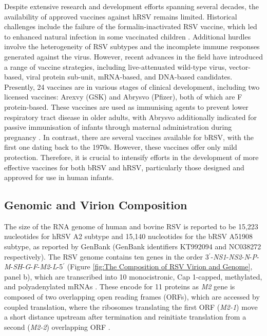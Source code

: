 Despite extensive research and development efforts spanning several decades, the availability of approved vaccines against hRSV remains limited. Historical challenges include the failure of the formalin-inactivated RSV vaccine, which led to enhanced natural infection in some vaccinated children \cite{Fulginiti1969RespiratoryVaccine., Kim1969RespiratoryVaccine.}. Additional hurdles involve the heterogeneity of RSV subtypes and the incomplete immune responses generated against the virus. However, recent advances in the field have introduced a range of vaccine strategies, including live-attenuated wild-type virus, vector-based, viral protein sub-unit, mRNA-based, and DNA-based candidates. Presently, 24 vaccines are in various stages of clinical development, including two licensed vaccines: Arexvy (GSK) and Abrysvo (Pfizer), both of which are F protein-based. These vaccines are used as immunising agents to prevent lower respiratory tract disease in older adults, with Abrysvo additionally indicated for passive immunisation of infants through maternal administration during pregnancy \cite{Topalidou2023RespiratoryVaccines}. In contrast, there are several vaccines available for bRSV, with the first one dating back to the 1970s. However, these vaccines offer only mild protection. Therefore, it is crucial to intensify efforts in the development of more effective vaccines for both bRSV \cite{Ellis2017HowCattle} and hRSV, particularly those designed and approved for use in human infants.

\subsection{Genomic and Virion Composition} \label{subsec:Genomic and Virion Composition}
The size of the RNA genome of human and bovine RSV is reported to be 15,223 nucleotides for hRSV A2 subtype and 15,140 nucleotides for the bRSV A51908 subtype, as reported by GenBank (GenBank identifiers KT992094 and NC038272 respectively). The RSV genome contains ten genes in the order 3$^{\prime}$-\textit{NS1}-\textit{NS2}-\textit{N}-\textit{P}-\textit{M}-\textit{SH}-\textit{G}-\textit{F}-\textit{M2}-\textit{L}-5$^{\prime}$ (Figure \ref{fig:The Composition of RSV Virion and Genome}, panel b), which are transcribed into 10 monocistronic, Cap 1-capped, methylated, and polyadenylated mRNAs \cite{Collins2013RespiratoryDisease, Bohmwald2016HumanPathology}. These encode for 11 proteins as \textit{M2} gene is composed of two overlapping open reading frames (ORFs), which are accessed by coupled translation, where the ribosomes translating the first ORF (\textit{M2-1}) move a short distance upstream after termination and reinitiate translation from a second (\textit{M2-2}) overlapping ORF \cite{Gould2007CouplediPneumovirinae/i}.

